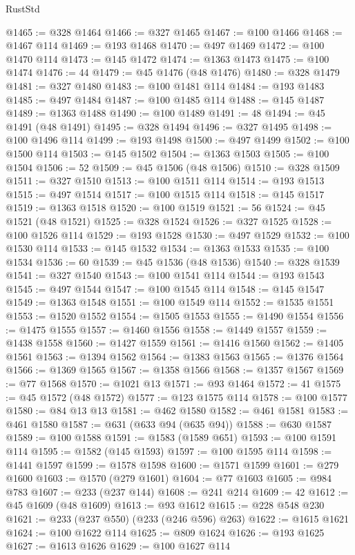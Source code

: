 \begin{lexlean}{RustStd}
\begin{coremodule}
@1465 := @328 @1464
@1466 := @327 @1465
@1467 := @100 @1466
@1468 := @1467 @114
@1469 := @193 @1468
@1470 := @497 @1469
@1472 := @100 @1470 @114
@1473 := @145 @1472
@1474 := @1363 @1473
@1475 := @100 @1474
@1476 := 44
@1479 := @45 @1476 (@48 @1476)
@1480 := @328 @1479
@1481 := @327 @1480
@1483 := @100 @1481 @114
@1484 := @193 @1483
@1485 := @497 @1484
@1487 := @100 @1485 @114
@1488 := @145 @1487
@1489 := @1363 @1488
@1490 := @100 @1489
@1491 := 48
@1494 := @45 @1491 (@48 @1491)
@1495 := @328 @1494
@1496 := @327 @1495
@1498 := @100 @1496 @114
@1499 := @193 @1498
@1500 := @497 @1499
@1502 := @100 @1500 @114
@1503 := @145 @1502
@1504 := @1363 @1503
@1505 := @100 @1504
@1506 := 52
@1509 := @45 @1506 (@48 @1506)
@1510 := @328 @1509
@1511 := @327 @1510
@1513 := @100 @1511 @114
@1514 := @193 @1513
@1515 := @497 @1514
@1517 := @100 @1515 @114
@1518 := @145 @1517
@1519 := @1363 @1518
@1520 := @100 @1519
@1521 := 56
@1524 := @45 @1521 (@48 @1521)
@1525 := @328 @1524
@1526 := @327 @1525
@1528 := @100 @1526 @114
@1529 := @193 @1528
@1530 := @497 @1529
@1532 := @100 @1530 @114
@1533 := @145 @1532
@1534 := @1363 @1533
@1535 := @100 @1534
@1536 := 60
@1539 := @45 @1536 (@48 @1536)
@1540 := @328 @1539
@1541 := @327 @1540
@1543 := @100 @1541 @114
@1544 := @193 @1543
@1545 := @497 @1544
@1547 := @100 @1545 @114
@1548 := @145 @1547
@1549 := @1363 @1548
@1551 := @100 @1549 @114
@1552 := @1535 @1551
@1553 := @1520 @1552
@1554 := @1505 @1553
@1555 := @1490 @1554
@1556 := @1475 @1555
@1557 := @1460 @1556
@1558 := @1449 @1557
@1559 := @1438 @1558
@1560 := @1427 @1559
@1561 := @1416 @1560
@1562 := @1405 @1561
@1563 := @1394 @1562
@1564 := @1383 @1563
@1565 := @1376 @1564
@1566 := @1369 @1565
@1567 := @1358 @1566
@1568 := @1357 @1567
@1569 := @77 @1568
@1570 := @1021 @13
@1571 := @93 @1464
@1572 := 41
@1575 := @45 @1572 (@48 @1572)
@1577 := @123 @1575 @114
@1578 := @100 @1577
@1580 := @84 @13 @13
@1581 := @462 @1580
@1582 := @461 @1581
@1583 := @461 @1580
@1587 := @631 (@633 @94 (@635 @94))
@1588 := @630 @1587
@1589 := @100 @1588
@1591 := @1583 (@1589 @651)
@1593 := @100 @1591 @114
@1595 := @1582 (@145 @1593)
@1597 := @100 @1595 @114
@1598 := @1441 @1597
@1599 := @1578 @1598
@1600 := @1571 @1599
@1601 := @279 @1600
@1603 := @1570 (@279 @1601)
@1604 := @77 @1603
@1605 := @984 @783
@1607 := @233 (@237 @144)
@1608 := @241 @214
@1609 := 42
@1612 := @45 @1609 (@48 @1609)
@1613 := @93 @1612
@1615 := @228 @548 @230
@1621 := @233 (@237 @550) (@233 (@246 @596) @263)
@1622 := @1615 @1621
@1624 := @100 @1622 @114
@1625 := @809 @1624
@1626 := @193 @1625
@1627 := @1613 @1626
@1629 := @100 @1627 @114

\end{coremodule}
\end{lexlean}
